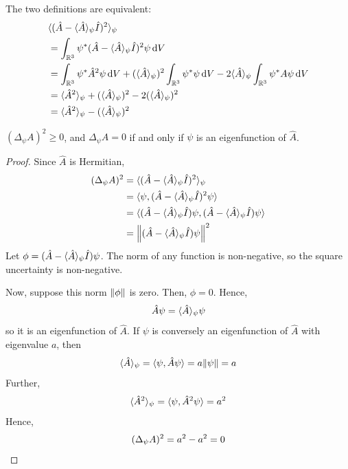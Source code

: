 \documentclass[a4paper,11pt]{article}
\begin{document}
The two definitions are equivalent:
\begin{align*}
&\langle{(\hat A - \langle{\hat A}\rangle_\psi \hat I)^2}\rangle_\psi\\ 
 & = \int_{\mathbb R^3} \psi^* (\hat A - \langle{\hat A}\rangle_\psi \hat I)^2 \psi \dd{V}                                                                                                          \\
& = \int_{\mathbb R^3} \psi^* \hat A^2 \psi \dd{V} + (\langle{\hat A}\rangle_\psi)^2 \int_{\mathbb R^3} \psi^* \psi \dd{V} - 2 \langle{\hat A}\rangle_\psi \int_{\mathbb R^3} \psi^* A \psi \dd{V} \\
& = \langle{\hat A^2}\rangle_{\psi} + (\langle{\hat A}\rangle_{\psi})^2 - 2(\langle{\hat A}\rangle_\psi)^2                                                                                                         \\
& = \langle{\hat A^2}\rangle_{\psi} - (\langle{\hat A}\rangle_{\psi})^2
\end{align*}

\begin{lemma}
	\( (\Delta_\psi A)^2 \geq 0 \), and \( \Delta_\psi A = 0 \) if and only if \( \psi \) is an eigenfunction of \( \hat A \).
\end{lemma}
\begin{proof}
	Since \( \hat A \) is Hermitian,
	\begin{align*}
		(\Delta_\psi A)^2 & = \langle{(\hat A - \langle{\hat A}\rangle_\psi \hat I)^2}\rangle_\psi                                              \\
		                  & = \langle{\psi, (\hat A - \langle{\hat A}\rangle_\psi \hat I)^2 \psi}\rangle                                        \\
		                  & = \langle{(\hat A - \langle{\hat A}\rangle_\psi \hat I)\psi, (\hat A - \langle{\hat A}\rangle_\psi \hat I) \psi}\rangle \\
		                  & = \norm{(\hat A - \langle{\hat A}\rangle_\psi \hat I)\psi}^2
	\end{align*}
	Let \( \phi = (\hat A - \langle{\hat A}\rangle_\psi \hat I)\psi \).
	The norm of any function is non-negative, so the square uncertainty is non-negative.

	Now, suppose this norm \( \norm{\phi} \) is zero.
	Then, \( \phi = 0 \).
	Hence,
	\[
		\hat A \psi = \langle{\hat A}\rangle_\psi \psi
	\]
	so it is an eigenfunction of \( \hat A \).
	If \( \psi \) is conversely an eigenfunction of \( \hat A \) with eigenvalue \( a \), then
	\[
		\langle{\hat A}\rangle_\psi = \langle{\psi, \hat A \psi}\rangle = a \norm{\psi} = a
	\]
	Further,
	\[
		\langle{\hat A^2}\rangle_\psi = \langle{\psi, \hat A^2 \psi}\rangle = a^2
	\]
	Hence,
	\[
		(\Delta_\psi A)^2 = a^2 - a^2 = 0\qedhere
	\]
\end{proof}
\end{document}
